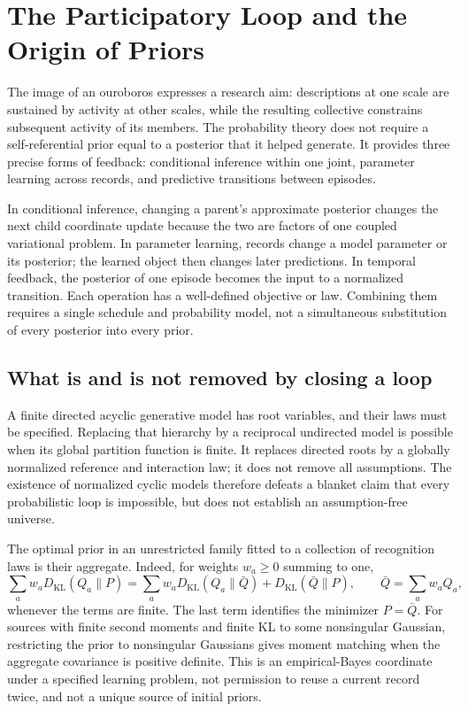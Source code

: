 \section{The Participatory Loop and the Origin of Priors}\label{sec:ouroboros}

The image of an ouroboros expresses a research aim: descriptions at one scale are sustained by activity at other scales, while the resulting collective constrains subsequent activity of its members. The probability theory does not require a self-referential prior equal to a posterior that it helped generate. It provides three precise forms of feedback: conditional inference within one joint, parameter learning across records, and predictive transitions between episodes.

In conditional inference, changing a parent's approximate posterior changes the next child coordinate update because the two are factors of one coupled variational problem. In parameter learning, records change a model parameter or its posterior; the learned object then changes later predictions. In temporal feedback, the posterior of one episode becomes the input to a normalized transition. Each operation has a well-defined objective or law. Combining them requires a single schedule and probability model, not a simultaneous substitution of every posterior into every prior.

\subsection{What is and is not removed by closing a loop}
A finite directed acyclic generative model has root variables, and their laws must be specified. Replacing that hierarchy by a reciprocal undirected model is possible when its global partition function is finite. It replaces directed roots by a globally normalized reference and interaction law; it does not remove all assumptions. The existence of normalized cyclic models therefore defeats a blanket claim that every probabilistic loop is impossible, but does not establish an assumption-free universe.

The optimal prior in an unrestricted family fitted to a collection of recognition laws is their aggregate. Indeed, for weights $w_a\geq0$ summing to one,
\begin{equation}
\sum_a w_aD_{\mathrm{KL}}(Q_a\|P)
=\sum_a w_aD_{\mathrm{KL}}(Q_a\|\bar Q)+D_{\mathrm{KL}}(\bar Q\|P),
\qquad \bar Q=\sum_a w_aQ_a,
\label{eq:aggregate_prior_identity}
\end{equation}
whenever the terms are finite. The last term identifies the minimizer $P=\bar Q$. For sources with finite second moments and finite KL to some nonsingular Gaussian, restricting the prior to nonsingular Gaussians gives moment matching when the aggregate covariance is positive definite. This is an empirical-Bayes coordinate under a specified learning problem, not permission to reuse a current record twice, and not a unique source of initial priors.

